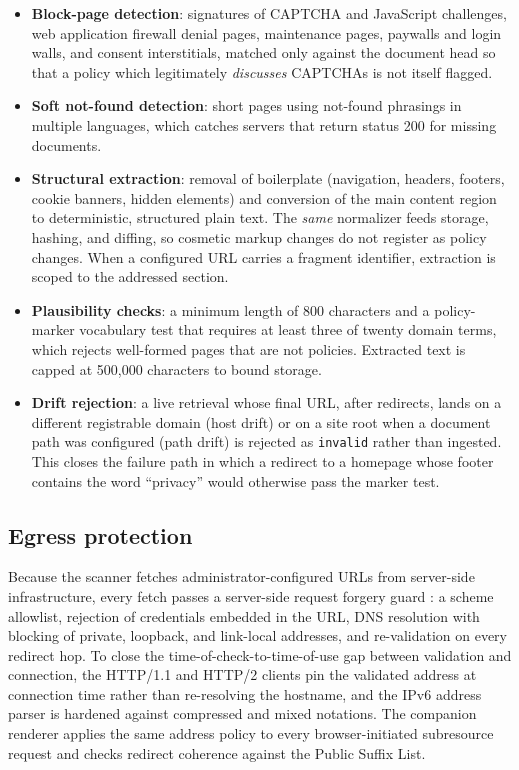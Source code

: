 \documentclass[11pt]{article}
\begin{document}
\begin{itemize}[leftmargin=*]
  \item \textbf{Block-page detection}: signatures of CAPTCHA and JavaScript
  challenges, web application firewall denial pages, maintenance pages,
  paywalls and login walls, and consent interstitials, matched only against the
  document head so that a policy which legitimately \emph{discusses} CAPTCHAs is
  not itself flagged.
  \item \textbf{Soft not-found detection}: short pages using not-found
  phrasings in multiple languages, which catches servers that return status 200
  for missing documents.
  \item \textbf{Structural extraction}: removal of boilerplate (navigation,
  headers, footers, cookie banners, hidden elements) and conversion of the main
  content region to deterministic, structured plain text. The
  \emph{same} normalizer feeds storage, hashing, and diffing, so cosmetic markup
  changes do not register as policy changes. When a configured URL carries a
  fragment identifier, extraction is scoped to the addressed section.
  \item \textbf{Plausibility checks}: a minimum length of 800 characters and a
  policy-marker vocabulary test that requires at least three of twenty
  domain terms, which rejects well-formed pages that are not policies. Extracted
  text is capped at 500{,}000 characters to bound storage.
  \item \textbf{Drift rejection}: a live retrieval whose final URL, after
  redirects, lands on a different registrable domain (host drift) or on a site
  root when a document path was configured (path drift) is rejected as
  \texttt{invalid} rather than ingested. This closes the failure path in which a
  redirect to a homepage whose footer contains the word ``privacy'' would
  otherwise pass the marker test.
\end{itemize}

\subsection{Egress protection}
Because the scanner fetches administrator-configured URLs from server-side
infrastructure, every fetch passes a server-side request forgery guard \cite{owasp2021}: a scheme
allowlist, rejection of credentials embedded in the URL, DNS resolution with
blocking of private, loopback, and link-local addresses, and re-validation on
every redirect hop. To close the time-of-check-to-time-of-use gap between
validation and connection, the HTTP/1.1 and HTTP/2 clients pin the validated
address at connection time rather than re-resolving the hostname, and the IPv6
address parser is hardened against compressed and mixed notations. The companion
renderer applies the same address policy to every browser-initiated subresource
request and checks redirect coherence against the Public Suffix List.
\end{document}
